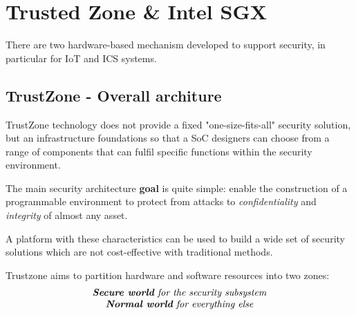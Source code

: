 \chapter{Trusted Zone \& Intel SGX}
There are two hardware-based mechanism developed to support security,
in particular for IoT and ICS systems.

\section{TrustZone - Overall architure}
TrustZone technology does not provide a fixed "one-size-fits-all" security solution,
but an infrastructure foundations so that a SoC designers can
choose from a range of components that can fulfil specific functions within the security environment.

The main security architecture \textbf{goal} is quite simple:
enable the construction of a programmable environment to protect from attacks to \textit{confidentiality} and \textit{integrity} of almost any asset.

A platform with these characteristics can be used to build a wide set of
security solutions which are not cost-effective with traditional methods.


Trustzone aims to partition hardware and software resources into two zones:
\[
   \begin{array}{c}
      \textit{\textbf{Secure world} for the security subsystem} \\
      \textit{\textbf{Normal world} for everything else}
   \end{array}
\]


